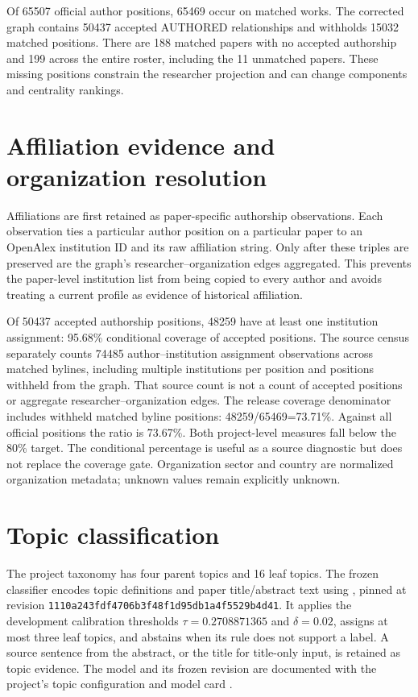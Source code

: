 Of \num{65507} official author positions, \num{65469} occur on matched works.
The corrected graph contains \num{50437} accepted AUTHORED relationships and
withholds \num{15032} matched positions. There are 188 matched papers with no
accepted authorship and 199 across the entire roster, including the 11 unmatched
papers. These missing positions constrain the researcher projection and can
change components and centrality rankings.

\section{Affiliation evidence and organization resolution}

Affiliations are first retained as paper-specific authorship observations. Each
observation ties a particular author position on a particular paper to an
OpenAlex institution ID and its raw affiliation string. Only after these triples
are preserved are the graph's researcher--organization edges aggregated. This
prevents the paper-level institution list from being copied to every author and
avoids treating a current profile as evidence of historical affiliation.

Of \num{50437} accepted authorship positions, \num{48259} have at least one
institution assignment: 95.68\% conditional coverage of accepted positions.
The source census separately counts \num{74485} author--institution assignment
observations across matched bylines, including multiple institutions per
position and positions withheld from the graph. That source count is not a count
of accepted positions or aggregate researcher--organization edges.
The release coverage denominator includes withheld matched byline positions:
\num{48259}/\num{65469}=73.71\%. Against all official positions the ratio is
73.67\%. Both project-level measures fall below the 80\% target. The conditional
percentage is useful as a source diagnostic but does not replace the coverage
gate. Organization sector and country are normalized organization metadata;
unknown values remain explicitly unknown.

\section{Topic classification}

The project taxonomy has four parent topics and 16 leaf topics. The frozen
classifier encodes topic definitions and paper title/abstract text using
, pinned at revision
\texttt{1110a243fdf4706b3f48f1d95db1a4f5529b4d41}. It applies the development
calibration thresholds $\tau=0.2708871365$ and $\delta=0.02$, assigns at most
three leaf topics, and abstains when its rule does not support a label. A source
sentence from the abstract, or the title for title-only input, is retained as
topic evidence. The model and its frozen revision are documented with the
project's topic configuration and model card \citep{reimers2019sentencebert,minilmModelCard}.

